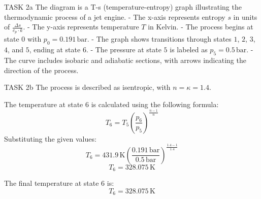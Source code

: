 TASK 2a  
The diagram is a T-s (temperature-entropy) graph illustrating the thermodynamic process of a jet engine.  
- The x-axis represents entropy \( s \) in units of \( \frac{\Delta s}{c_p \cdot k} \).  
- The y-axis represents temperature \( T \) in Kelvin.  
- The process begins at state \( 0 \) with \( p_0 = 0.191 \, \text{bar} \).  
- The graph shows transitions through states \( 1 \), \( 2 \), \( 3 \), \( 4 \), and \( 5 \), ending at state \( 6 \).  
- The pressure at state \( 5 \) is labeled as \( p_5 = 0.5 \, \text{bar} \).  
- The curve includes isobaric and adiabatic sections, with arrows indicating the direction of the process.  

TASK 2b  
The process is described as isentropic, with \( n = \kappa = 1.4 \).  

The temperature at state \( 6 \) is calculated using the following formula:  
\[
T_6 = T_5 \left( \frac{p_6}{p_5} \right)^{\frac{n-1}{n}}
\]  
Substituting the given values:  
\[
T_6 = 431.9 \, \text{K} \left( \frac{0.191 \, \text{bar}}{0.5 \, \text{bar}} \right)^{\frac{1.4-1}{1.4}}
\]  
\[
T_6 = 328.075 \, \text{K}
\]  

The final temperature at state \( 6 \) is:  
\[
T_6 = 328.075 \, \text{K}
\]